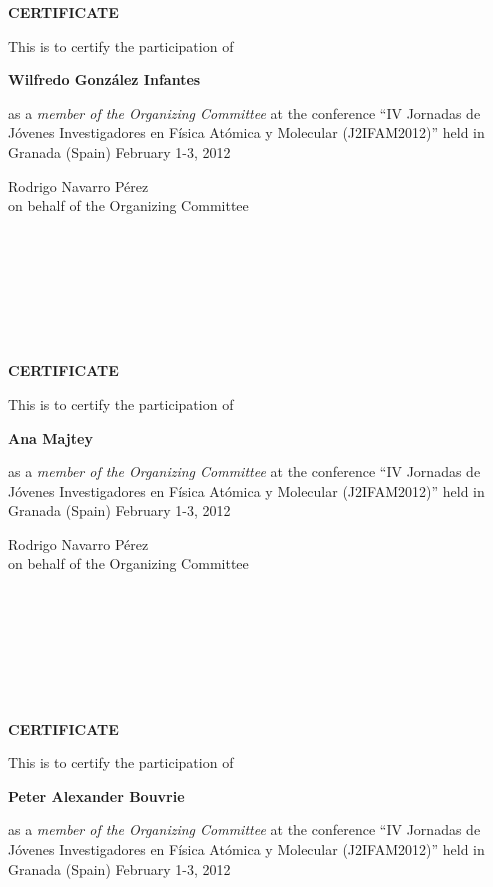 \documentclass [13pt,a4paper] {letter}
\begin{document}
\pagestyle{empty}
\begin{center}
{\bf {\Huge CERTIFICATE}}

\vspace {1.5cm}
This is to certify the participation of
\vspace {1cm}

{\bf \Large  Wilfredo    González Infantes }
\vspace {1cm}

as a \emph{member of the Organizing Committee} at the conference { \textquotedblleft IV Jornadas de Jóvenes Investigadores en Física Atómica y Molecular (J2IFAM2012)\textquotedblright} 
held in Granada (Spain) February 1-3, 2012
\end{center}
\vspace {4cm}
\begin{raggedleft}
Rodrigo Navarro Pérez\\
on behalf of the Organizing Committee
\newpage
\end{raggedleft}
\begin{verbatim}







\end{verbatim}
\pagestyle{empty}
\begin{center}
{\bf {\Huge CERTIFICATE}}

\vspace {1.5cm}
This is to certify the participation of
\vspace {1cm}

{\bf \Large  Ana    Majtey }
\vspace {1cm}

as a \emph{member of the Organizing Committee} at the conference { \textquotedblleft IV Jornadas de Jóvenes Investigadores en Física Atómica y Molecular (J2IFAM2012)\textquotedblright} 
held in Granada (Spain) February 1-3, 2012
\end{center}
\vspace {4cm}
\begin{raggedleft}
Rodrigo Navarro Pérez\\
on behalf of the Organizing Committee
\newpage
\end{raggedleft}
\begin{verbatim}







\end{verbatim}
\pagestyle{empty}
\begin{center}
{\bf {\Huge CERTIFICATE}}

\vspace {1.5cm}
This is to certify the participation of
\vspace {1cm}

{\bf \Large  Peter  Alexander  Bouvrie }
\vspace {1cm}

as a \emph{member of the Organizing Committee} at the conference { \textquotedblleft IV Jornadas de Jóvenes Investigadores en Física Atómica y Molecular (J2IFAM2012)\textquotedblright} 
held in Granada (Spain) February 1-3, 2012
\end{center}
\end{document}

